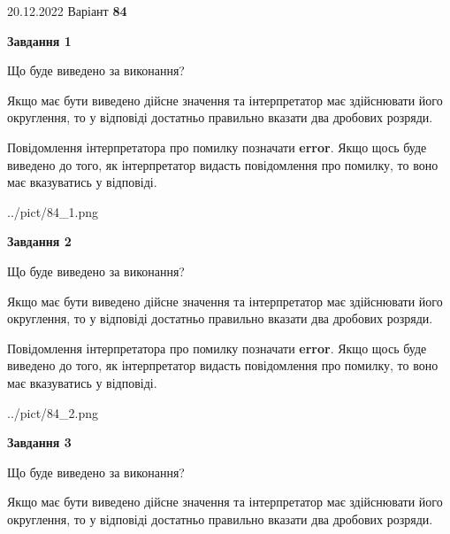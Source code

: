 \documentclass[12pt, ukrainian]{article}
\begin{document}
{20.12.2022 Варіант \No \textbf { 84 }\par}
{
\begin {Large}

{\begin {center}\textbf{Завдання 1}\end {center}}\par
Що буде виведено за виконання? \par

Якщо має бути виведено дійсне значення та інтерпретатор має здійснювати його округлення, 
то у відповіді достатньо правильно вказати два дробових розряди.

Повідомлення інтерпретатора про помилку позначати \textbf{error}.
Якщо щось буде виведено до того, як інтерпретатор видасть повідомлення про помилку, 
то воно має вказуватись у відповіді. \par

\begin{center}
	{../pict/84_1.png}
\end{center}
\newpage

{\begin {center}\textbf{Завдання 2}\end {center}}\par
Що буде виведено за виконання? \par

Якщо має бути виведено дійсне значення та інтерпретатор має здійснювати його округлення, 
то у відповіді достатньо правильно вказати два дробових розряди.

Повідомлення інтерпретатора про помилку позначати \textbf{error}.
Якщо щось буде виведено до того, як інтерпретатор видасть повідомлення про помилку, 
то воно має вказуватись у відповіді. \par

\begin{center}
	{../pict/84_2.png}
\end{center}
\newpage

{\begin {center}\textbf{Завдання 3}\end {center}}\par
Що буде виведено за виконання? \par

Якщо має бути виведено дійсне значення та інтерпретатор має здійснювати його округлення, 
то у відповіді достатньо правильно вказати два дробових розряди.


\end{Large}}
\end{document}
